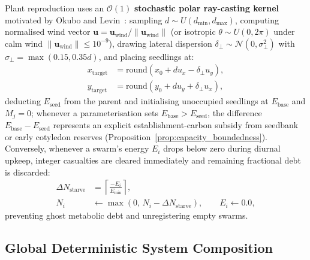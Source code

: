 Plant reproduction uses an $\mathcal{O}(1)$ \textbf{stochastic polar ray-casting kernel} motivated by Okubo and Levin~\cite{okubo2001diffusion}: sampling $d \sim U(d_{\min}, d_{\max})$, computing normalised wind vector $\mathbf{u} = \mathbf{u}_{\text{wind}} / \|\mathbf{u}_{\text{wind}}\|$ (or isotropic $\theta \sim U(0, 2\pi)$ under calm wind $\|\mathbf{u}_{\text{wind}}\| \le 10^{-9}$), drawing lateral dispersion $\delta_\perp \sim \mathcal{N}(0, \sigma_\perp^2)$ with $\sigma_\perp = \max(0.15, 0.35 d)$, and placing seedlings at:
\begin{align}
  x_{\text{target}} &= \text{round}\left( x_0 + d u_x - \delta_\perp u_y \right), \label{eq:seed_projection_x} \\
  y_{\text{target}} &= \text{round}\left( y_0 + d u_y + \delta_\perp u_x \right), \label{eq:seed_projection_y}
\end{align}
deducting $E_{\text{seed}}$ from the parent and initialising unoccupied seedlings at $E_{\text{base}}$ and $M_j = 0$; whenever a parameterisation sets $E_{\text{base}} > E_{\text{seed}}$, the difference $E_{\text{base}} - E_{\text{seed}}$ represents an explicit establishment-carbon subsidy from seedbank or early cotyledon reserves (Proposition~\ref{prop:capacity_boundedness}). Conversely, whenever a swarm's energy $E_i$ drops below zero during diurnal upkeep, integer casualties are cleared immediately and remaining fractional debt is discarded:
\begin{align}
  \Delta N_{\text{starve}} &= \left\lceil \frac{-E_i}{E_{\text{min}}} \right\rceil, \nonumber \\
  N_i &\gets \max\!\left(0,\, N_i - \Delta N_{\text{starve}}\right), \qquad E_i \gets 0.0,
  \label{eq:integer_casualty_clearing}
\end{align}
preventing ghost metabolic debt and unregistering empty swarms.

\subsection{Global Deterministic System Composition}
\label{subsec:system_composition}


